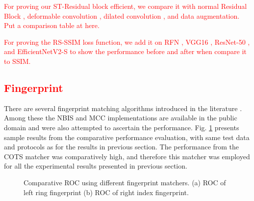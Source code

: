 \textcolor{red}{For proving our ST-Residual block efficient, we compare it with normal Residual Block \cite{he2016deep}, deformable convolution \cite{zhu2019deformable}, dilated convolution \cite{yu2015multi}, and data augmentation. Put a comparison table at here.}

\textcolor{red}{For proving the RS-SSIM loss function, we add it on RFN \cite{liu2020contactless}, VGG16 \cite{simonyan2014very}, ResNet-50 \cite{he2016deep}, and EfficientNetV2-S \cite{tan2021efficientnetv2} to show the performance before and after when compare it to SSIM.}

\textcolor{red}{\subsection{Fingerprint}}

There are several fingerprint matching algorithms introduced in the literature \cite{maltoni2009handbook}. Among these the NBIS and MCC implementations are available in the public domain and were also attempted to ascertain the performance. Fig. \ref{compare-fingerprint} presents sample results from the comparative performance evaluation, with same test data and protocols as for the results in previous section. The performance from the COTS matcher was comparatively high, and therefore this matcher was employed for all the experimental results presented in previous section. 
\begin{figure}[ht]
    \centering
    \caption{Comparative ROC using different fingerprint matchers. (a) ROC of left ring fingerprint (b) ROC of right index fingerprint.}
    \label{compare-fingerprint}
\end{figure}

